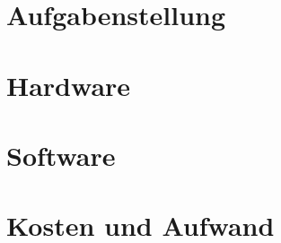 \documentclass[12pt]{article}
\begin{document}
	\begin{titlepage}
		
	\end{titlepage}
	
	\tableofcontents
	\newpage
	
	\section{Aufgabenstellung}
	

	\section{Hardware}
	
	
	\section{Software}
	
	
	\section{Kosten und Aufwand}
	
\end{document}
